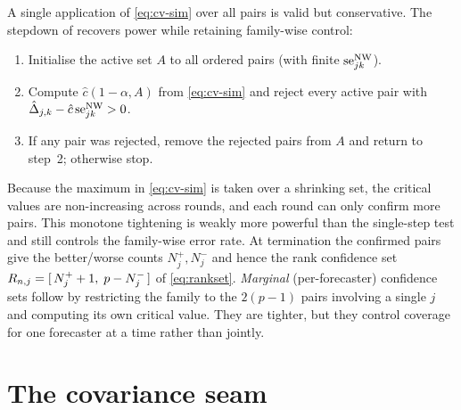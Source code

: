 A single application of \eqref{eq:cv-sim} over all pairs is valid but conservative. The
stepdown of \citet{romanowolf2005} recovers power while retaining family-wise control:

\begin{enumerate}[nosep]
  \item Initialise the active set $A$ to all ordered pairs (with finite $\mathrm{se}^{\mathrm{NW}}_{jk}$).
  \item Compute $\hat{c}(1-\alpha, A)$ from \eqref{eq:cv-sim} and reject every active
        pair with $\hat{\Delta}_{j,k} - \hat{c}\,\mathrm{se}^{\mathrm{NW}}_{jk} > 0$.
  \item If any pair was rejected, remove the rejected pairs from $A$ and return to
        step~2; otherwise stop.
\end{enumerate}

Because the maximum in \eqref{eq:cv-sim} is taken over a shrinking set, the critical
values are non-increasing across rounds, and each round can only confirm more pairs.
This monotone tightening is weakly more powerful than the single-step test and still
controls the family-wise error rate. At termination the confirmed pairs give the
better/worse counts $N^+_j,N^-_j$ and hence the rank confidence set
$R_{n,j}=[\,N^+_j+1,\;p-N^-_j\,]$ of \eqref{eq:rankset}. \emph{Marginal}
(per-forecaster) confidence sets follow by restricting the family to the $2(p-1)$ pairs
involving a single $j$ and computing its own critical value. They are tighter, but they
control coverage for one forecaster at a time rather than jointly.

\section{The covariance seam}
\label{sec:seam}

